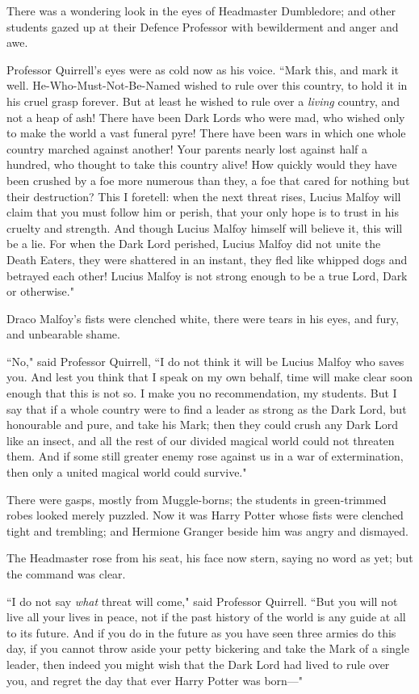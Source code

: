 There was a wondering look in the eyes of Headmaster Dumbledore; and other students gazed up at their Defence Professor with bewilderment and anger and awe.

Professor Quirrell's eyes were as cold now as his voice. ``Mark this, and mark it well. He-Who-Must-Not-Be-Named wished to rule over this country, to hold it in his cruel grasp forever. But at least he wished to rule over a \emph{living} country, and not a heap of ash! There have been Dark Lords who were mad, who wished only to make the world a vast funeral pyre! There have been wars in which one whole country marched against another! Your parents nearly lost against half a hundred, who thought to take this country alive! How quickly would they have been crushed by a foe more numerous than they, a foe that cared for nothing but their destruction? This I foretell: when the next threat rises, Lucius Malfoy will claim that you must follow him or perish, that your only hope is to trust in his cruelty and strength. And though Lucius Malfoy himself will believe it, this will be a lie. For when the Dark Lord perished, Lucius Malfoy did not unite the Death Eaters, they were shattered in an instant, they fled like whipped dogs and betrayed each other! Lucius Malfoy is not strong enough to be a true Lord, Dark or otherwise."

Draco Malfoy's fists were clenched white, there were tears in his eyes, and fury, and unbearable shame.

``No," said Professor Quirrell, ``I do not think it will be Lucius Malfoy who saves you. And lest you think that I speak on my own behalf, time will make clear soon enough that this is not so. I make you no recommendation, my students. But I say that if a whole country were to find a leader as strong as the Dark Lord, but honourable and pure, and take his Mark; then they could crush any Dark Lord like an insect, and all the rest of our divided magical world could not threaten them. And if some still greater enemy rose against us in a war of extermination, then only a united magical world could survive."

There were gasps, mostly from Muggle-borns; the students in green-trimmed robes looked merely puzzled. Now it was Harry Potter whose fists were clenched tight and trembling; and Hermione Granger beside him was angry and dismayed.

The Headmaster rose from his seat, his face now stern, saying no word as yet; but the command was clear.

``I do not say \emph{what} threat will come," said Professor Quirrell. ``But you will not live all your lives in peace, not if the past history of the world is any guide at all to its future. And if you do in the future as you have seen three armies do this day, if you cannot throw aside your petty bickering and take the Mark of a single leader, then indeed you might wish that the Dark Lord had lived to rule over you, and regret the day that ever Harry Potter was born—"

